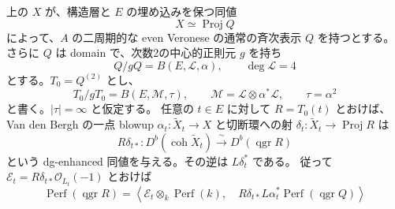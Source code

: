 \begin{theorem}
\label{blowup:quadric-section-equivalence}
上の $X$ が、構造層と $E$ の埋め込みを保つ同値
\[
 X\simeq\operatorname{Proj}Q
\]
によって、$A$ の二周期的な even Veronese の通常の斉次表示 $Q$ を持つとする。
さらに $Q$ は domain で、次数2の中心的正則元 $g$ を持ち
\[
 Q/gQ=B(E,\mathcal L,\alpha),\qquad \deg\mathcal L=4
\]
とする。$T_0=Q^{(2)}$ とし、
\[
 T_0/gT_0=B(E,\mathcal M,\tau),\qquad
 \mathcal M=\mathcal L\otimes\alpha^*\mathcal L,\qquad
 \tau=\alpha^2
\]
と書く。$|\tau|=\infty$ と仮定する。
任意の $t\in E$ に対して $R=T_0(t)$ とおけば、
Van den Bergh の一点 blowup $\alpha_t\colon\widetilde X_t\to X$ と切断環への射
$\delta_t\colon\widetilde X_t\to\operatorname{Proj}R$ は
\[
 R\delta_{t*}\colon D^b(\operatorname{coh}\widetilde X_t)
       \xrightarrow{\ \sim\ }D^b(\operatorname{qgr}R)
\]
という dg-enhanced 同値を与える。その逆は $L\delta_t^*$ である。
従って $\mathcal E_t=R\delta_{t*}\mathcal O_{L_t}(-1)$ とおけば
\begin{equation}\label{blowup:quadric-unconditional-sod}
 \operatorname{Perf}(\operatorname{qgr}R)
 =\left\langle
     \mathcal E_t\otimes_k\operatorname{Perf}(k),\quad
     R\delta_{t*}L\alpha_t^*\operatorname{Perf}(\operatorname{qgr}Q)
   \right\rangle
\end{equation}
\end{theorem}


